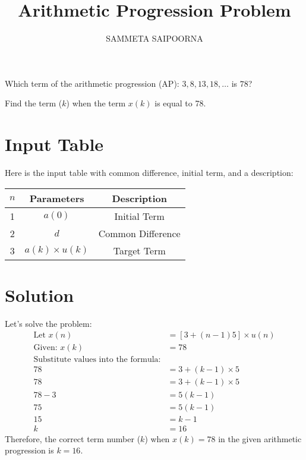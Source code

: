 \documentclass[12pt]{article}
\title{Arithmetic Progression Problem}
\author{SAMMETA SAIPOORNA}
\date{}
\newcommand{\initialterm}{3}
\newcommand{\commondifference}{5}
\newcommand{\targetterm}{78}
\begin{document}
\maketitle

Which term of the arithmetic progression (AP): \(3, 8, 13, 18, \ldots\) is \(78\)? 

Find the term (\(k\)) when the term \(x(k)\) is equal to 78.

\section{Input Table}
Here is the input table with common difference, initial term, and a description:

\begin{center}
\begin{tabular}{|c|c|c|}
  \hline
  \(n\) & Parameters & Description \\
  \hline
  1 & \(a(0)\) & Initial Term \\
  \hline
  2 & \(d\) & Common Difference \\
  \hline
  3 & \(a(k) \times u(k)\) & Target Term \\
  \hline
\end{tabular}
\end{center}

\section{Solution}
Let's solve the problem:
\begin{align*}
\text{Let } x(n) &= [\initialterm + (n-1)\commondifference] \times u(n) \\
\text{Given: } x(k) &= \targetterm \\
\text{Substitute values into the formula:} \\
\targetterm &= \initialterm + (k-1) \times \commondifference \\
\targetterm &= 3 + (k-1) \times 5 \\
\targetterm - 3 &= 5(k-1) \\
75 &= 5(k-1) \\
15 &= k-1 \\
k &= 16
\end{align*}
Therefore, the correct term number (\(k\)) when \(x(k) = 78\) in the given arithmetic progression is \(k = 16\).
\end{document}
